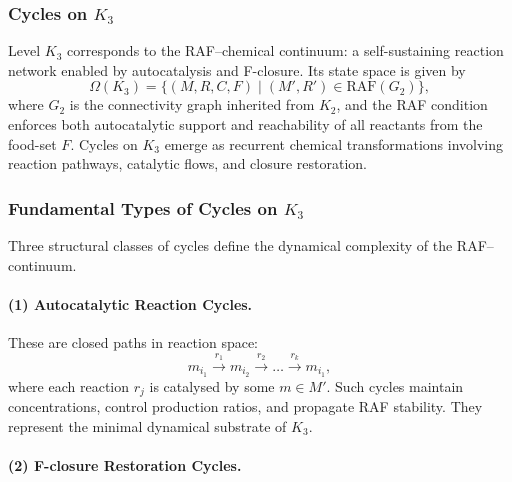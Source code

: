 
\subsubsection{Cycles on \texorpdfstring{$K_3$}{K_3}}
\label{sec:cycles-k3}

Level $K_3$ corresponds to the RAF–chemical continuum: 
a self-sustaining reaction network enabled by autocatalysis and
F-closure.  
Its state space is given by
\[
  \Omega(K_3) = \{(M,R,C,F)\mid (M',R')\in \mathrm{RAF}(G_2)\},
\]
where $G_2$ is the connectivity graph inherited from $K_2$,
and the RAF condition enforces both autocatalytic support and reachability
of all reactants from the food-set $F$.
Cycles on $K_3$ emerge as recurrent chemical transformations involving
reaction pathways, catalytic flows, and closure restoration.

\subsubsection{Fundamental Types of Cycles on \texorpdfstring{$K_3$}{K_3}}

Three structural classes of cycles define the dynamical complexity of
the RAF–continuum.

\paragraph{(1) Autocatalytic Reaction Cycles.}

These are closed paths in reaction space:
\[
  m_{i_1}\xrightarrow{r_1} m_{i_2}
    \xrightarrow{r_2} \dots
    \xrightarrow{r_k} m_{i_1},
\]
where each reaction $r_j$ is catalysed by some $m\in M'$.
Such cycles maintain concentrations, control production ratios, and
propagate RAF stability.
They represent the minimal dynamical substrate of $K_3$.

\paragraph{(2) F-closure Restoration Cycles.}

